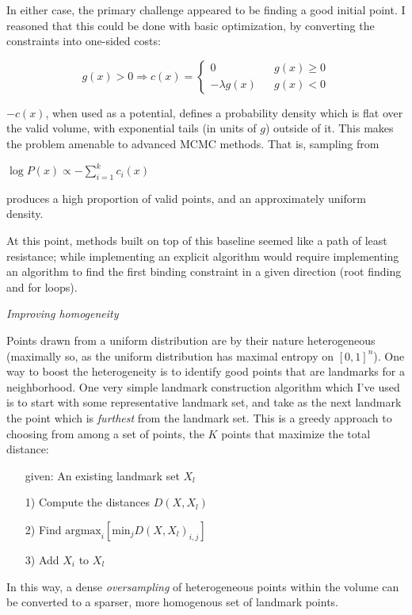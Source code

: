 \documentclass{article}
\begin{document}
In either case, the primary challenge appeared to be finding a good initial point. I reasoned that this could be done with basic optimization, by converting the constraints into one-sided costs:

$$g(x) > 0 \Rightarrow c(x) = \left\{\begin{array}{ccc} 0 & & g(x) \geq 0 \\ -\lambda g(x) & & g(x) < 0\end{array}\right.$$

$-c(x)$, when used as a potential, defines a probability density which is flat over the valid volume, with exponential tails (in units of $g$) outside of it. This makes the problem amenable to advanced MCMC methods. That is, sampling from

$\log P(x) \propto -\sum_{i=1}^k c_i(x)$

produces a high proportion of valid points, and an approximately uniform density.

At this point, methods built on top of this baseline seemed like a path of least resistance; while implementing an explicit algorithm would require implementing an algorithm to find the first binding constraint in a given direction (root finding and for loops).

\textit{Improving homogeneity}

Points drawn from a uniform distribution are by their nature heterogeneous (maximally so, as the uniform distribution has maximal entropy on $[0,1]^n$). One way to boost the heterogeneity is to identify good points that are landmarks for a neighborhood. One very simple landmark construction algorithm which I've used is to start with some representative landmark set, and take as the next landmark the point which is \textit{furthest} from the landmark set. This is a greedy approach to choosing from among a set of points, the $K$ points that maximize the total distance:

\begin{itemize}
\item[given:] An existing landmark set $X_l$
\item[1)] Compute the distances $D(X, X_l)$
\item[2)] Find $\mathrm{argmax}_i[\mathrm{min}_j D(X, X_l)_{i, j}]$
\item[3)] Add $X_i$ to $X_l$
\end{itemize}

In this way, a dense \textit{oversampling} of heterogeneous points within the volume can be converted to a sparser, more homogenous set of landmark points.
\end{document}
